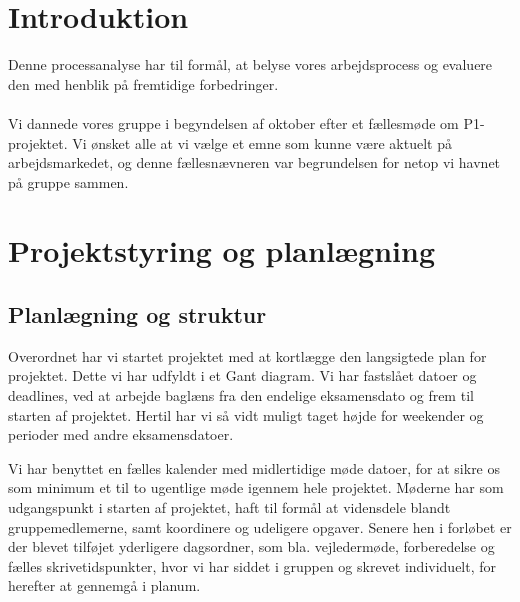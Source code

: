 \documentclass[12pt,a4paper]{article}
\begin{document}
\section{Introduktion}
\label{introduktion}
Denne processanalyse har til formål, at belyse vores arbejdsprocess og evaluere den med henblik på fremtidige forbedringer. \\ \\
Vi dannede vores gruppe i begyndelsen af oktober efter et fællesmøde om P1-projektet. Vi ønsket alle at vi vælge et emne som kunne være aktuelt på arbejdsmarkedet, og denne fællesnævneren var begrundelsen for netop vi havnet på gruppe sammen. 




\section{Projektstyring og planlægning}
\subsection{Planlægning og struktur}
Overordnet har vi startet projektet med at kortlægge den langsigtede plan for projektet. Dette vi har udfyldt i et Gant diagram. Vi har fastslået datoer og deadlines, ved at arbejde baglæns fra den endelige eksamensdato og frem til starten af projektet. Hertil har vi så vidt muligt taget højde for weekender og perioder med andre eksamensdatoer.

Vi har benyttet en fælles kalender med midlertidige møde datoer, for at sikre os som minimum et til to ugentlige møde igennem hele projektet. Møderne har som udgangspunkt i starten af projektet, haft til formål at vidensdele blandt gruppemedlemerne, samt koordinere og udeligere opgaver. Senere hen i forløbet er der blevet tilføjet yderligere dagsordner, som bla. vejledermøde, forberedelse og fælles skrivetidspunkter, hvor vi har siddet i gruppen og skrevet individuelt, for herefter at gennemgå i planum.
\end{document}
